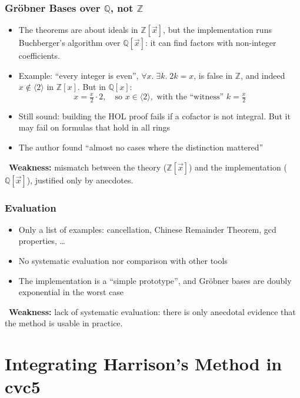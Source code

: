 \documentclass[usepdftitle=false,aspectratio=169,usenames,dvipsnames]{beamer}
\newcommand{\redmark}{\color{red}{\ding{55}}}
\newcommand\vitem{\vfill\item}
\newcommand\pvitem{\pause\vfill\item}
\newcommand{\weakness}[1]{\begin{weaknessbox}\small{\redmark}\ \textbf{Weakness:} #1\end{weaknessbox}}
\begin{document}
\begin{frame}
  \frametitle{Gr\"obner Bases over $\mathbb{Q}$, not $\mathbb{Z}$}
  \begin{itemize}
    \item The theorems are about ideals in $\mathbb{Z}[\vec{x}]$, but the implementation runs Buchberger's algorithm over $\mathbb{Q}[\vec{x}]$: it can find factors with non-integer coefficients.
    \pvitem Example: ``every integer is even'', $\forall x.\; \exists k.\; 2k = x$, is false in $\mathbb{Z}$, and indeed $x \notin \langle 2 \rangle$ in $\mathbb{Z}[x]$. But in $\mathbb{Q}[x]$:
      \[ x = \tfrac{x}{2} \cdot 2, \quad \text{so } x \in \langle 2 \rangle, \text{ with the ``witness'' } k = \tfrac{x}{2} \]
    \pvitem Still sound: building the HOL proof fails if a cofactor is not integral. But it may fail on formulas that hold in all rings
    \pvitem The author found ``almost no cases where the distinction mattered''
  \end{itemize}
  \pause
  \vfill
  \weakness{mismatch between the theory ($\mathbb{Z}[\vec{x}]$) and the implementation ($\mathbb{Q}[\vec{x}]$), justified only by anecdotes.}
\end{frame}

\begin{frame}
  \frametitle{Evaluation}
  \begin{itemize}
    \item Only a list of examples: cancellation, Chinese Remainder Theorem, gcd properties, \ldots
    \vitem No systematic evaluation nor comparison with other tools
    \vitem The implementation is a ``simple prototype'', and Gr\"obner bases are doubly exponential in the worst case
  \end{itemize}
  \pause
  \vfill
  \weakness{lack of systematic evaluation: there is only anecdotal evidence that the method is usable in practice.}
\end{frame}

\section{Integrating Harrison's Method in cvc5}
\end{document}
